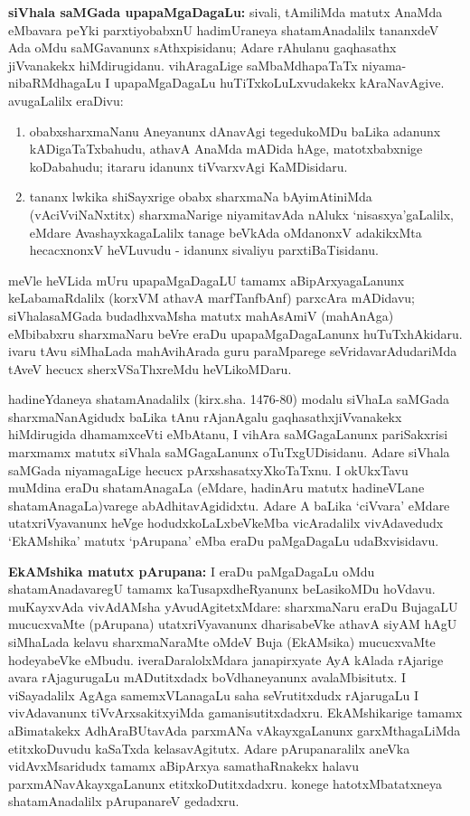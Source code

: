 \smallskip

{\bf siVhala saMGada upapaMgaDagaLu:} sivali, tAmiliMda matutx AnaMda eMbavara peYki parxtiyobabxnU hadimUraneya shatamAnadalilx tananxdeV Ada oMdu saMGavanunx sAthxpisidanu; Adare rAhulanu gaqhasathx jiVvanakekx hiMdirugidanu. vihAragaLige saMbaMdhapaTaTx niyama-nibaRMdhagaLu I upapaMgaDagaLu huTiTxkoLuLxvudakekx kAraNa\-vAgive. avugaLalilx eraDivu:
\begin{enumerate}
\renewcommand{\theenumi}{\alph{enumi}}
\renewcommand{\labelenumi}{(\theenumi)}
\item obabxsharxmaNanu Aneyanunx dAnavAgi tegedukoMDu baLika adanunx kADigaTaTx\-bahudu, athavA AnaMda mADida hAge, matotxbabxnige koDabahudu; itararu idanunx tiVvarxvAgi KaMDisidaru.

\item tananx lwkika shiSayxrige obabx sharxmaNa bAyimAtiniMda (vAciVviNaNxtitx) sharxmaNarige niyamitavAda nAlukx `nisasxya'gaLalilx, eMdare AvashayxkagaLalilx tanage beVkAda oMdanonxV adakikxMta hecacxnonxV heVLuvudu - idanunx sivaliyu parxtiBaTisidanu.
\end{enumerate}

meVle heVLida mUru upapaMgaDagaLU tamamx aBipArxyagaLanunx keLabamaRdalilx (korxVM athavA marfTanfbAnf) parxcAra mADidavu; siVhalasaMGada budadhxvaMsha matutx mahAsAmiV (mahAnAga) eMbibabxru sharxmaNaru beVre eraDu upapaMgaDa\-gaLanunx huTuTxhAkidaru. ivaru tAvu siMhaLada mahAvihArada guru paraMparege seVri\-dava\-rAdudariMda tAveV hecucx sherxVSaThxreMdu heVLikoMDaru.

hadineYdaneya shatamAnadalilx (kirx.sha. 1476-80) modalu siVhaLa saMGada sharxmaNanAgidudx baLika tAnu rAjanAgalu gaqhasathxjiVvanakekx hiMdirugida dhamamxceVti eMbAtanu, I vihAra saMGagaLanunx pariSakxrisi marxmamx matutx siVhala saMGagaLanunx oTuTxgUDisidanu. Adare siVhala saMGada niyamagaLige hecucx pArxshasatxyXkoTaTxnu. I okUkxTavu muMdina eraDu shatamAnagaLa (eMdare, hadinAru matutx hadineVLane shatamAnagaLa)varege abAdhitavAgididxtu. Adare A baLika `ciVvara' eMdare utatxriVyavanunx heVge hodudxkoLaLxbeVkeMba vicAradalilx vivAdavedudx `EkAMshika' matutx `pArupana' eMba eraDu paMgaDagaLu udaBxvisidavu.

{\bf EkAMshika matutx pArupana:} I eraDu paMgaDagaLu oMdu shatamAnadavaregU tamamx kaTusapxdheRyanunx beLasikoMDu hoVdavu. muKayxvAda vivAdAMsha yAvudAgitetxMdare: sharxmaNaru eraDu BujagaLU mucucxvaMte (pArupana) utatxriVyavanunx dharisabeVke athavA siyAM hAgU siMhaLada kelavu sharxmaNaraMte oMdeV Buja (EkAMsika) mucucxvaMte hodeyabeVke eMbudu. iveraDaralolxMdara janapirxyate AyA kAlada rAjarige avara rAjagurugaLu mADutitxdadx boVdhaneyanunx avalaMbisitutx. I viSayadalilx AgAga samemxVLanagaLu saha seVrutitxdudx rAjarugaLu I vivAdavanunx tiVvArxsakitxyiMda gamanisutitxdadxru. EkAMshikarige tamamx aBimatakekx AdhAraBUtavAda parxmANa vAkayxgaLanunx garxMthagaLiMda etitxkoDuvudu kaSaTxda kelasavAgitutx. Adare pArupanaralilx aneVka vidAvxMsaridudx tamamx aBipArxya samathaRnakekx halavu parxmANavAkayxgaLanunx etitxkoDutitxdadxru. konege hatotxMbatatxneya shatamAnadalilx pArupanareV gedadxru.


